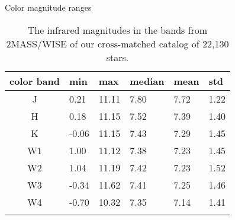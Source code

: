 \begin{table}[t]
    \footnotesize
    \centering
    \caption{Color magnitude ranges}
    \begin{tabular}{clllll}
    \toprule
    color band & min & max & median & mean & std \\ \midrule
    J & 0.21 & 11.11 & 7.80 & 7.72 & 1.22 \\
    H & 0.18 & 11.15 & 7.52 & 7.39 & 1.40 \\
    K & -0.06 & 11.15 & 7.43 & 7.29 & 1.45 \\
    W1 & 1.00 & 11.12 & 7.38 & 7.23 & 1.45 \\
    W2 & 1.04 & 11.19 & 7.42 & 7.23 & 1.52 \\
    W3 & -0.34 & 11.62 & 7.41 & 7.25 & 1.46 \\
    W4 & -0.70 & 10.32 & 7.35 & 7.14 & 1.41 \\
    \bottomrule
    \addlinespace[10pt]
    \end{tabular}
    \caption*{The infrared magnitudes in the bands from 2MASS/WISE of our cross-matched catalog of 22,130 stars.}
    \label{table:michigan_mags}
\end{table}